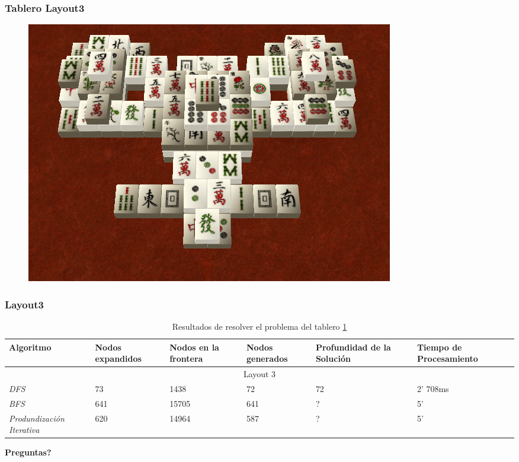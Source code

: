 \documentclass{beamer}
\begin{document}
\begin{frame}
\frametitle{Tablero Layout3}
\begin{figure}[hb]
	\includegraphics[scale=0.3]{../Boards/Layout4.png}
	 \label{fig:layout4}
\end{figure}
\end{frame}

\begin{frame}
\frametitle{Layout3}

\tiny{
\begin{table}[h]
\begin{center}
	\begin{tabular}{|p{1.3cm}|p{1cm}|p{1cm}|p{1cm}|p{2cm}|p{2cm}|}
	\hline
	 Algoritmo & Nodos expandidos & Nodos en la frontera & Nodos generados & Profundidad de la Soluci\'on & Tiempo de Procesamiento\\
	\hline \hline
		 \multicolumn{6}{|c|}{Layout 3} \\
	\hline
	\textit{DFS} & 73 & 1438 & 72 & 72 & 2' 708ms \\
	\textit{BFS} & 641 & 15705 & 641 & ? & 5' \\
	\textit{Produndizaci\'on Iterativa} & 620 & 14964 & 587 & ? & 5' \\	
	\hline
	\end{tabular}
\end{center}
\caption{Resultados de resolver el problema del tablero \ref{fig:layout4}}
\label{tab:costLayout4}
\end{table}}

\end{frame}

\begin{frame}
\textbf{\Huge{Preguntas?}}
\end{frame}
\end{document}
